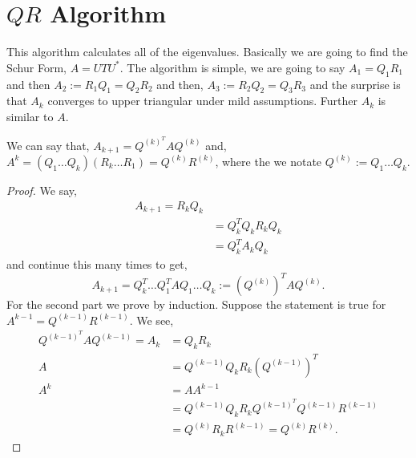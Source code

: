 
\section{$QR$ Algorithm}
This algorithm calculates all of the eigenvalues. Basically we are going to find the Schur Form, $A = UTU^*$. The algorithm is simple, we are going to say $A_1 = Q_1R_1$ and then $A_2 := R_1Q_1 = Q_2R_2$ and then, $A_3 := R_2Q_2 = Q_3R_3$ and the surprise is that $A_k$ converges to upper triangular under mild assumptions. Further $A_k$ is similar to $A$.

\begin{nthm}
  We can say that,
  $A_{k+1} = Q^{(k)}^T A Q^{(k)}$
  and,
  $A^k = (Q_1\dots Q_k)(R_k \dots R_1) = Q^{(k)}R^{(k)}$,
  where the we notate $Q^{(k)} := Q_1\dots Q_k$.
\end{nthm}
\begin{proof}
  We say,
  \begin{align*}
    A_{k+1} = R_kQ_k  \\
    &= Q_k^T Q_kR_k Q_k \\
    &= Q_k^T A_k Q_k
  \end{align*}
  and continue this many times to get,
  $$ A_{k+1} = Q_k^T \dots Q_1^T A Q_1\dots Q_k := (Q^{(k)})^T A Q^{(k)}. $$
  For the second part we prove by induction. Suppose the statement is true for $A^{k-1} = Q^{(k-1)}R^{(k-1)}$. We see,
  \begin{align*}
    Q^{(k-1)}^T A Q^{(k-1)} = A_k &= Q_kR_k \\
    A &= Q^{(k-1)} Q_kR_k (Q^{(k-1)})^T \\
    A^k &= AA^{k-1} \\
    &= Q^{(k-1)}Q_kR_k Q^{(k-1)}^T Q^{(k-1)} R^{(k-1)} \\
    &= Q^{(k)}R_k R^{(k-1)} = Q^{(k)}R^{(k)}.
  \end{align*}
\end{proof}

